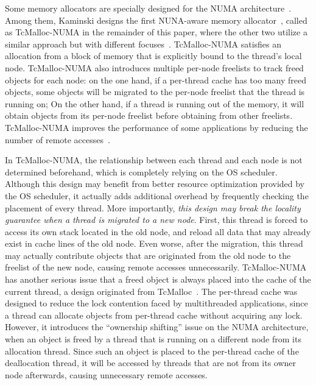 Some memory allocators are specially designed for the NUMA architecture~\cite{tcmallocnew, kim2013node, yang2019jarena}. Among them, Kaminski designs the first NUNA-aware memory allocator~\cite{tcmallocnew}, called as TcMalloc-NUMA in the remainder of this paper, where the other two utilize a similar approach but with different focuses~\cite{kim2013node, yang2019jarena}. TcMalloc-NUMA satisfies an allocation from a block of memory that is explicitly bound to the thread's local node. TcMalloc-NUMA also introduces multiple per-node freelists to track freed objects for each node: on the one hand, if a per-thread cache has too many freed objects, some objects will be migrated to the per-node freelist that the thread is running on; On the other hand, if a thread is running out of the memory, it will obtain objects from its per-node freelist before obtaining from other freelists. TcMalloc-NUMA improves the performance of some applications by reducing the number of remote accesses~\cite{tcmallocnew}.  

 


In TcMalloc-NUMA, the relationship between each thread and each node is not determined beforehand, which is completely relying on the OS scheduler. Although this design may benefit from better resource optimization provided by the OS scheduler, it actually adds additional overhead by frequently checking the placement of every thread. More importantly, \textit{this design may break the locality guarantee when a thread is migrated to a new node}. First, this thread is forced to access its own stack located in the old node, and reload all data that may already exist in cache lines of the old node. Even worse, after the migration, this thread may actually contribute objects that are originated from the old node to the freelist of the new node, causing remote accesses unnecessarily.  TcMalloc-NUMA has another serious issue that a freed object is always placed into the cache of the current thread, a design originated from TcMalloc~\cite{tcmalloc}.  The per-thread cache was designed to reduce the lock contention faced by multithreaded applications, since a thread can allocate objects from per-thread cache without acquiring any lock. However, it introduces the ``ownership shifting'' issue on the NUMA architecture, when an object is freed by a thread that is running on a different node from its allocation thread. Since such an object is placed to the per-thread cache of the deallocation thread, it will be accessed by threads that are not from its owner node afterwards, causing unnecessary remote accesses. 


